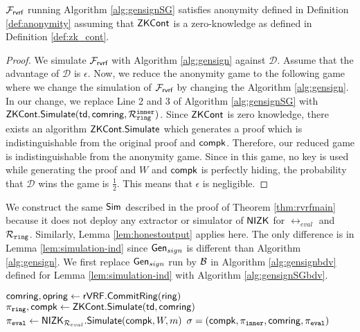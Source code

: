 \begin{lemma} \label{lem:anonymitySG} $ \mathcal{F}_{\textsf{rvrf}} $ running Algorithm \ref{alg:gensignSG} satisfies anonymity defined in Definition \ref{def:anonymity} assuming that ${\mathsf{ZKCont}} $ is a zero-knowledge as defined in Definition \ref{def:zk_cont}.
\end{lemma}

\begin{proof}
We simulate $ \mathcal{F}_{\textsf{rvrf}} $ with Algorithm \ref{alg:gensign} against $ \mathcal{D} $. Assume that the advantage of $ \mathcal{D} $ is $ \epsilon $. Now, we reduce the anonymity game to the following game where we change the simulation of $ \mathcal{F}_{\textsf{rvrf}} $ by changing the Algorithm \ref{alg:gensign}. In our change, we replace Line 2 and 3 of Algorithm \ref{alg:gensignSG} with $ {\mathsf{ZKCont}}.{\mathsf{Simulate}}(\mathsf{td}, \mathsf{comring},\mathcal{R}_{\mathtt{ring}}^{\mathtt{inner}}) $. Since $ {\mathsf{ZKCont}}$ is zero knowledge, there exists an algorithm  $ {\mathsf{ZKCont}}.{\mathsf{Simulate}}$ which generates a proof which is indistinguishable from the original proof and $ \mathsf{compk} $. Therefore, our reduced game is indistinguishable from the anonymity game. Since in this game, no  key is used while generating the proof and $ W $ and $ \mathsf{compk} $ is perfectly hiding, the probability that  $ \mathcal{D} $ wins the game is $ \frac{1}{2} $. This means that $ \epsilon $ is negligible.		
\end{proof}


We construct the same $ \mathsf{Sim} $ described in the proof of Theorem \ref{thm:rvrfmain} because it does not deploy any extractor or simulator of $ {\mathsf{NIZK}} $ for $ \rel_{eval} $ and $ \mathcal{R}_{\mathtt{ring}} $. Similarly, Lemma \ref{lem:honestoutput} applies here. The only difference is in Lemma \ref{lem:simulation-ind} since $ \mathsf{Gen}_{sign} $ is different than Algorithm \ref{alg:gensign}.
We first replace $ \mathsf{Gen}_{sign} $ run by $ \mathcal{B} $ in Algorithm \ref{alg:gensignbdv} defined for Lemma \ref{lem:simulation-ind} with Algorithm \ref{alg:gensignSGbdv}.

\begin{algorithm}
\caption{$\gen_{sign}(\ring,W,\pk,\aux,m)$}
\label{alg:gensignSGbdv}	 	
\begin{algorithmic}[1]
	\State $ \mathsf{comring}, \mathsf{opring} \leftarrow {\ensuremath{\mathsf{rVRF}}}.{\mathsf{CommitRing}}(\mathsf{ring}) $
	\State $ \pi_{\mathtt{ring}},\mathsf{compk} \leftarrow {\ensuremath{\mathsf{ZKCont}}}.{\mathsf{Simulate}}(\mathsf{td},\mathsf{comring}) $ 
	\State $ \pi_{\mathtt{eval}} \leftarrow {\ensuremath{\mathsf{NIZK}}}_{\mathcal{R}_{eval}}.{\mathsf{Simulate}}(\mathsf{compk}, W,m) $
	\State\Return$ \sigma = (\mathsf{compk}, \pi_{\mathtt{inner}},\mathsf{comring}, \pi_{\mathtt{eval}}) $
\end{algorithmic}

\end{algorithm}

